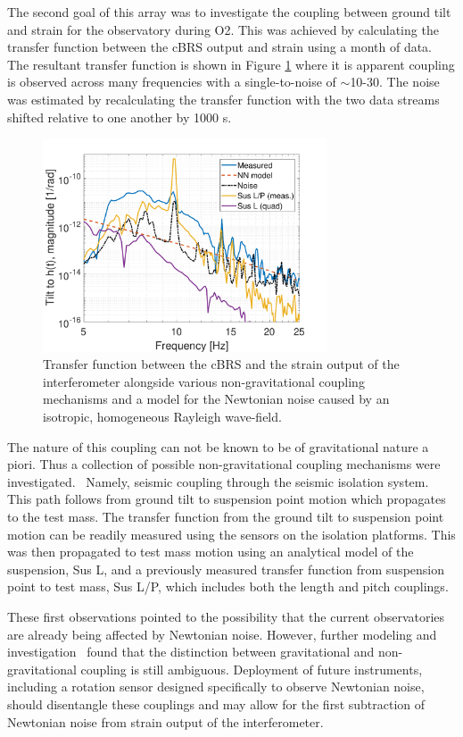 \documentclass [12pt, proquest]{uwthesis}[2019]
\begin{document}
The second goal of this array was to investigate the coupling between ground tilt and strain for the observatory during O2. This was achieved by calculating the transfer function between the cBRS output and strain using a month of data. The resultant transfer function is shown in Figure \ref{NNCoupling} where it is apparent coupling is observed across many frequencies with a single-to-noise of $\sim$10-30. The noise was estimated by recalculating the transfer function with the two data streams shifted relative to one another by 1000 s. 

\begin{figure}[!h]
\begin{center}
\includegraphics[width=0.75\textwidth]{NNCoupling.pdf}
\end{center}
\caption[Transfer function between the cBRS and the strain output of the interferometer]{Transfer function between the cBRS and the strain output of the interferometer alongside various non-gravitational coupling mechanisms and a model for the Newtonian noise caused by an isotropic, homogeneous Rayleigh wave-field.}
\label{NNCoupling}
\end{figure}

The nature of this coupling can not be known to be of gravitational nature a piori. Thus a collection of possible non-gravitational coupling mechanisms were investigated.~\cite{NN} Namely, seismic coupling through the seismic isolation system. This path follows from ground tilt to suspension point motion which propagates to the test mass. The transfer function from the ground tilt to suspension point motion can be readily measured using the sensors on the isolation platforms. This was then propagated to test mass motion using an analytical model of the suspension, Sus L, and a previously measured transfer function from suspension point to test mass, Sus L/P, which includes both the length and pitch couplings.

These first observations pointed to the possibility that the current observatories are already being affected by Newtonian noise. However, further modeling and investigation~\cite{NN2} found that the distinction between gravitational and non-gravitational coupling is still ambiguous. Deployment of future instruments, including a rotation sensor designed specifically to observe Newtonian noise, should disentangle these couplings and may allow for the first subtraction of Newtonian noise from strain output of the interferometer.

\printendnotes
\nocite{*}   


\end{document}

